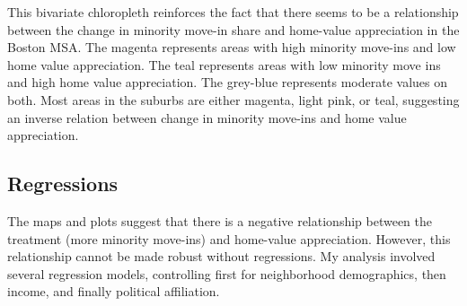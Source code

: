 \documentclass{article}
\begin{document}
\begin{center}
\end{center}
This bivariate chloropleth reinforces the fact that there seems to be a relationship between the change in minority move-in share and home-value appreciation in the Boston MSA. The magenta represents areas with high minority move-ins and low home value appreciation. The teal represents areas with low minority move ins and high home value appreciation. The grey-blue represents moderate values on both. Most areas in the suburbs are either magenta, light pink, or teal, suggesting an inverse relation between change in minority move-ins and home value appreciation.
\subsection{Regressions}
The maps and plots suggest that there is a negative relationship between the treatment (more minority move-ins) and home-value appreciation. However, this relationship cannot be made robust without regressions. My analysis involved several regression models, controlling first for neighborhood demographics, then income, and finally political affiliation.
\end{document}
